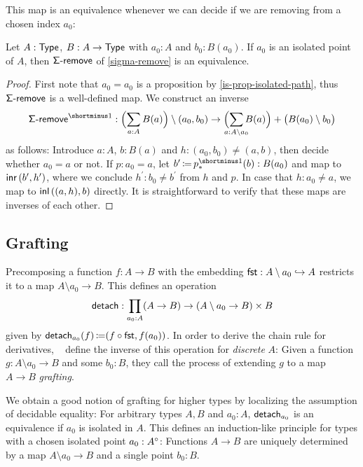 This map is an equivalence whenever we can decide if we are removing from a chosen index \( a_0 \):
\begin{proposition}\label{is-equiv-sigma-remove}
  Let \( A : \operatorname{\mathsf{Type}} \), \( B : A \to \operatorname{\mathsf{Type}} \) with \( a_0 : A \) and \( b_0 : B(a_0) \).
  If \( a_0 \) is an isolated point of \( A \), then \( \operatorname{\mathsf{\Sigma-remove}} \) of \autoref{sigma-remove}
  is an equivalence.
  \begin{proof}
    First note that \( a_0 = a_0 \) is a proposition by \autoref{is-prop-isolated-path},
    thus \( \operatorname{\mathsf{\Sigma-remove}} \) is a well-defined map.
    We construct an inverse
    \[
      \SigmaRemove^{\Inv}
        :
      \Bigl(\sum_{a : A} B(a) \Bigr) \setminus (a_0 , b_0)
        \to
      \Bigl(\smashoperator{\sum_{a : A \setminus a_0}} B(a)\Bigr) + \bigl(B(a_0) \setminus b_0\bigr)
    \]
    as follows:
    Introduce \( a : A \), \( b : B(a) \) and \( h : (a_0 , b_0) \neq (a , b) \),
    then decide whether \( a_0 = a \) or not.
    If \( p : a_0 = a \), let \( b^\prime \DefEq p^{\Inv}_*(b) : B(a_0) \) and map to \( \operatorname{\mathsf{inr}}{(b^\prime, h^\prime)} \),
    where we conclude \( h^\prime : b_0 \neq b^\prime \) from \( h \) and \( p \).
    In case that \( h : a_0 \neq a \), we map to \( \operatorname{\mathsf{inl}}{((a, h), b)} \) directly.
    It is straightforward to verify that these maps are inverses of each other.
  \end{proof}
\end{proposition}

\subsection{Grafting}\label{grafting}

Precomposing a function \( f : A \to B \) with the embedding \( \operatorname{\mathsf{fst}} : A \setminus a_0 \hookrightarrow A \) restricts it to a map \( A \setminus a_0 \to B \).
This defines an operation
\[
  \mathsf{detach} : \prod_{a_0 : A} (A \to B) \to (A \setminus a_0 \to B) \times B
\]
given by \( \mathsf{detach}_{a_0}(f) \operatorname{\mathrel{\coloneq}} (f \circ \operatorname{\mathsf{fst}}, f(a_0)) \).
In order to derive the chain rule for derivatives,
\citeauthor{AbbottEtAl2005DataDifferentiating}~\cite{AbbottEtAl2005DataDifferentiating} define the inverse of this operation
for \emph{discrete} \( A \):
Given a function \( g : A \setminus a_0 \to B \) and some \( b_0 : B \),
they call the process of extending \( g \) to a map \( A \to B \) \emph{grafting}.

We obtain a good notion of grafting for higher types by localizing the assumption of decidable equality:
For arbitrary types \( A, B \) and \( a_0 : A \),
\( \mathsf{detach}_{a_0} \) is an equivalence if \( a_0 \) is isolated in \( A \).
This defines an induction-like principle for types with a chosen isolated point \( a_0 : A^{\circ} \):
Functions \( A \to B \) are uniquely determined by a map \( A \setminus a_0 \to B \)
and a single point \( b_0 : B \).

